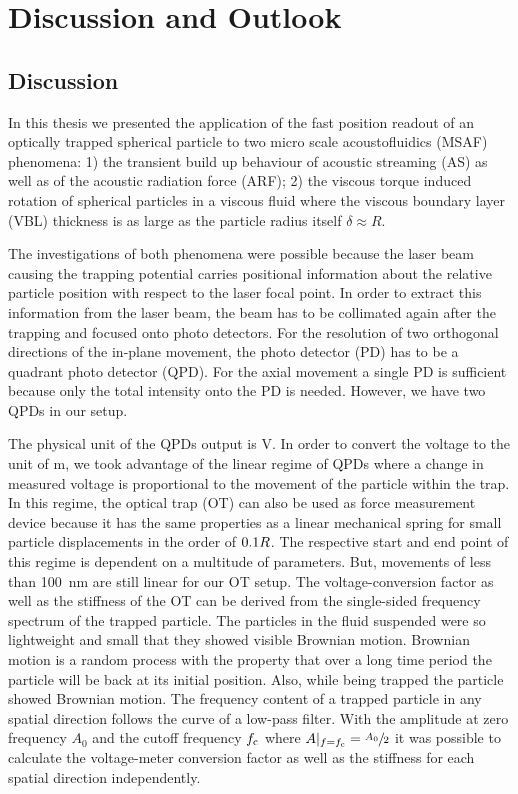 \chapter[Discussion \& Outlook]{Discussion and Outlook}\label{ch:discussion}

\section{Discussion}
In this thesis we presented the application of the fast position readout of an 
optically trapped spherical particle to two micro scale acoustofluidics (MSAF) 
phenomena: 1) the transient build up behaviour of acoustic streaming (AS) as 
well as of the acoustic radiation force (ARF); 2) the viscous torque induced 
rotation of spherical particles in a viscous fluid where the viscous boundary 
layer (VBL) thickness is as large as the particle radius itself $\delta \approx 
R$.

The investigations of both phenomena were possible because the laser beam 
causing the trapping potential carries positional information about the 
relative particle position with respect to the laser focal point. In order to 
extract this information from the laser beam, the beam has to be collimated 
again after the trapping and focused onto photo detectors. For the resolution 
of two orthogonal directions of the in-plane movement, the photo detector (PD) 
has to be a quadrant photo detector (QPD). For the axial movement a single PD 
is sufficient because only the total intensity onto the PD is needed. However, 
we have two QPDs in our setup.

The physical unit of the QPDs output is \si{\volt}. In order to convert the 
voltage to the unit of \si{\meter}, we took advantage of the linear regime of 
QPDs where a change in measured voltage is proportional to the movement of the 
particle within the trap. In this regime, the optical trap (OT) can also be 
used as force measurement device because it has the same properties as a linear 
mechanical spring for small particle displacements in the order of $0.1R$. 
The respective start and end point of this regime is dependent on a multitude 
of parameters. But, movements of less than \SI{100}{\nm} are still linear for 
our OT setup. The voltage-conversion factor as well as the stiffness of the OT 
can be derived from the single-sided frequency spectrum of the trapped 
particle. The particles in the fluid suspended were so lightweight and small 
that they showed visible Brownian motion. Brownian motion is a random process 
with the property that over a long time period the particle will be back at its 
initial position. Also, while being trapped the particle showed Brownian 
motion. The frequency content of a trapped particle in any spatial direction 
follows the curve of a low-pass filter. With the amplitude at zero frequency 
$A_{0}$ and the cutoff frequency $f_{\mathrm{c}}$ where 
$A\vert_{f=f_{\mathrm{c}}}=\sfrac{A_{0}}{2}$ it was possible to calculate the 
voltage-meter conversion factor as well as the stiffness for each spatial 
direction independently.

